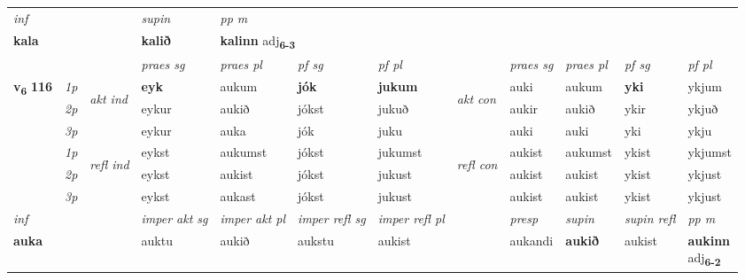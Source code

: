 \begin{longtable}[l]{X>{\footnotesize\itshape}llXXXXlXXXX}
\cmidrule{4-7}
   {\textit{inf}} & &      & \textit{supin}  & \textit{pp m} \\*
  {\textbf{kala}} & &      &  \textbf{kalið}  & \multicolumn{2}{l}{\textbf{kalinn} adj\textbf{\textsubscript{6-3}}} \\*

\midrule

 & &   & \textit{praes sg}  & \textit{praes pl}    & \textit{ pf sg} & \textit{pf pl} & & \textit{praes sg}  & \textit{praes pl}    & \textit{pf sg} & \textit{pf pl }  \\ \cmidrule{4-7} \cmidrule{9-12}
 \multirow{2}{*}{{{\textbf{v{\textsubscript{6}}} \Large{\textbf{116}}}}}  & 1p & \multirow{3}{*}{\begin{turn}{90}\textit{akt ind}\end{turn}} & \textbf{eyk} & aukum & \textbf{jók} & \textbf{jukum} & \multirow{3}{*}{\begin{turn}{90}\textit{akt con}\end{turn}} &auki & aukum & \textbf{yki} & ykjum\\*
 & 2p &  &  eykur  & aukið & jókst & jukuð & & aukir & aukið & ykir & ykjuð \\*
 & 3p &  & eykur & auka & jók & juku & & auki & auki& yki & ykju \\*
\cmidrule{4-7} \cmidrule{9-12}
 & 1p & \multirow{3}{*}{\begin{turn}{90}\textit{refl ind}\end{turn}}  & eykst & aukumst & jókst & jukumst & \multirow{3}{*}{\begin{turn}{90}\textit{refl con}\end{turn}}  &aukist & aukumst & ykist & ykjumst \\*
 & 2p &  & eykst & aukist & jókst & jukust & &aukist & aukist & ykist & ykjust \\*
 & 3p  & & eykst & aukast & jókst & jukust & & aukist & aukist& ykist & ykjust \\*
\cmidrule{4-7} \cmidrule{9-12}

   {\textit{inf}} & &  & \textit{imper akt sg} & \textit{imper akt pl} & \textit{imper refl sg} & \textit{imper refl pl} && \textit{presp} & \textit{supin} & \textit{supin refl} & \textit{pp m} \\*
  {\textbf{auka}} & && auktu  & aukið & aukstu & aukist && aukandi &  \textbf{aukið} & aukist & \specialcell{\textbf{aukinn} \\ adj\textbf{\textsubscript{6-2}}} \\*


\end{longtable}
